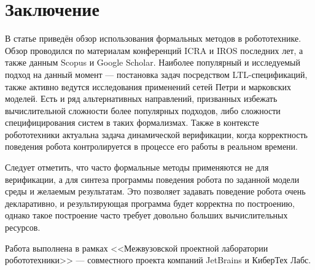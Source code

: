 \documentclass[a4, 14pt]{article}
\begin{document}
\section{Заключение}
В статье приведён обзор использования формальных методов в робототехнике. Обзор 
проводился по материалам конференций ICRA и IROS последних лет, а также 
данным Scopus и Google Scholar. Наиболее популярный и исследуемый подход на 
данный момент --- постановка задач посредством LTL-спецификаций, также 
активно ведутся исследования применений сетей Петри и марковских моделей. Есть 
и ряд альтернативных направлений, призванных избежать вычислительной сложности 
более популярных подходов, либо сложности специфицирования систем в таких 
формализмах. Также в контексте робототехники актуальна задача динамической верификации, 
когда корректность поведения робота контролируется в процессе его работы в реальном времени.

Следует отметить, что часто формальные методы применяются не для верификации, 
а для синтеза программы поведения робота по заданной модели среды и желаемым результатам. Это позволяет 
задавать поведение робота очень декларативно, и результирующая программа будет 
корректна по построению, однако такое построение часто требует довольно больших вычислительных ресурсов.

Работа выполнена в рамках <<Межвузовской проектной лаборатории робототехники>> --- совместного
проекта компаний JetBrains и КиберТех Лабс.



\end{document}
